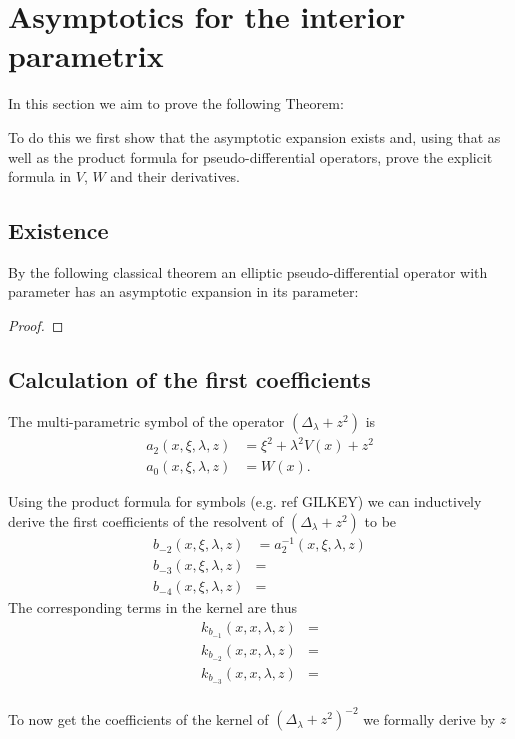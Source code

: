 \section{Asymptotics for the interior parametrix}
In this section we aim to prove the following Theorem:

To do this we first show that the asymptotic expansion exists and, using that as
well as the product formula for pseudo-differential operators, prove the
explicit formula in $V$, $W$ and their derivatives.
\subsection{Existence}
By the following classical theorem an elliptic pseudo-differential operator with
parameter has an asymptotic expansion in its parameter:

\begin{proof}
\end{proof}

\subsection{Calculation of the first coefficients}
The multi-parametric symbol of the operator $(\Delta_\lambda + z^2)$ is
\begin{align}
    a_2(x,\xi,\lambda,z) &= \xi^2 + \lambda^2 V(x) + z^2 \\
    a_0(x,\xi,\lambda,z) &= W(x).
    \label{eqn:symbol}
\end{align}

Using the product formula for symbols (e.g. ref GILKEY) we can inductively
derive the first coefficients of the resolvent of $(\Delta_\lambda + z^2)$ to be
\begin{align}
    b_{-2}(x,\xi,\lambda,z) &= a_2^{-1}(x,\xi,\lambda,z) \\
    b_{-3}(x,\xi,\lambda,z) &= \\
    b_{-4}(x,\xi,\lambda,z) &=
    \label{eqn:coeff-symbol}
\end{align}
The corresponding terms in the kernel are thus
\begin{align}
    k_{b_{-1}}(x,x,\lambda,z) &= \\
    k_{b_{-2}}(x,x,\lambda,z) &= \\
    k_{b_{-3}}(x,x,\lambda,z) &= \\
    \label{eqn:coeff-kernel}
\end{align}

To now get the coefficients of the kernel of $(\Delta_\lambda + z^2)^{-2}$ we
formally derive by $z$


